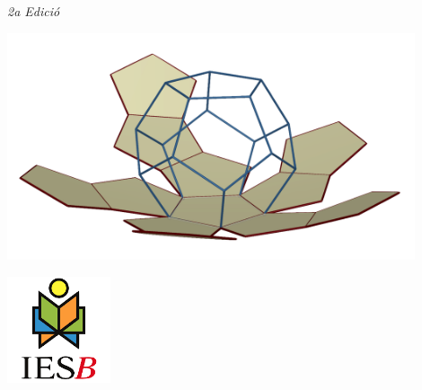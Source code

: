  
 \vspace*{0.5cm}
 

 \begin{center}
 	
 	\shadowoffset{2pt}
 	
	 \begin{blueshaded}
	 	\begin{center} 
	 	\vspace{0.5cm}
	 			
		{\fontsize{38}{57}\selectfont 
			\textbf{} 
		}
		 
		\vspace{1cm}
		\shadowoffset{1pt}
		{\huge \textbf{}}
	
		\vspace{1cm}
	
	{\Large \normalfont\textit{2a Edició}	}	
		\vspace{0.5cm}
\end{center}

\end{blueshaded}
 

 \vspace{1cm}
 
 \includegraphics[width=0.9\textwidth]{img-00/portada}

\vspace{1.5cm}

 
\begin{minipage}{0.4\textwidth}
\begin{center}
	\includegraphics*[width=1.2in]{img-00/ies-binissalem-logo}
 

\end{center}
\end{minipage}
\end{center}
